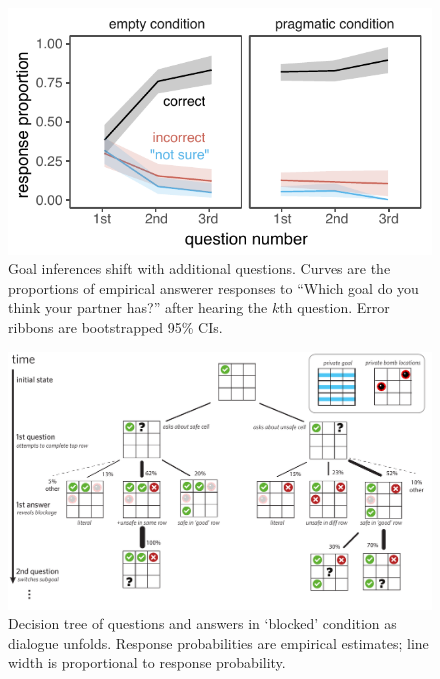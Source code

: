 \documentclass[11pt, floatsintext]{apa6}
\begin{document}
\begin{figure}[t!]
\begin{center}
\includegraphics[scale = .8]{Exp3/spatialGoalInference_final.pdf}
\end{center}
\caption{Goal inferences shift with additional questions. Curves are the proportions of empirical answerer responses to ``Which goal do you think your partner has?''  after hearing the $k$th question. Error ribbons are bootstrapped 95\% CIs.}
\label{fig:exp3goalinference}
\end{figure}


\begin{figure}[t!]
\begin{center}
\includegraphics[scale = .6]{Exp3/blocked.pdf}
\end{center}
\caption{Decision tree of questions and answers in `blocked' condition as dialogue unfolds. Response probabilities are empirical estimates; line width is proportional to response probability.}
\label{fig:blocked}
\end{figure}
\end{document}
